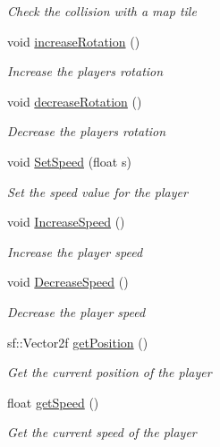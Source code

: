 \begin{DoxyCompactItemize}
\begin{DoxyCompactList}\small\item\em Check the collision with a map tile \end{DoxyCompactList}\item 
void \mbox{\hyperlink{class_player_a0f6f4bb800443551229331a68c3c3234}{increase\+Rotation}} ()
\begin{DoxyCompactList}\small\item\em Increase the players rotation \end{DoxyCompactList}\item 
void \mbox{\hyperlink{class_player_ad65092429c9fcb4d15f6af2591726b81}{decrease\+Rotation}} ()
\begin{DoxyCompactList}\small\item\em Decrease the players rotation \end{DoxyCompactList}\item 
void \mbox{\hyperlink{class_player_ab7bcb2b3c60dd8a86577ee3c488bc50a}{Set\+Speed}} (float s)
\begin{DoxyCompactList}\small\item\em Set the speed value for the player \end{DoxyCompactList}\item 
void \mbox{\hyperlink{class_player_a58c5d05acd71193708fb9e3f29c4f08c}{Increase\+Speed}} ()
\begin{DoxyCompactList}\small\item\em Increase the player speed \end{DoxyCompactList}\item 
void \mbox{\hyperlink{class_player_a0fc0bbed0ac5c2a0e25136b3e83faae6}{Decrease\+Speed}} ()
\begin{DoxyCompactList}\small\item\em Decrease the player speed \end{DoxyCompactList}\item 
sf\+::\+Vector2f \mbox{\hyperlink{class_player_a23356f99a9de86d3d47eadb679b332dc}{get\+Position}} ()
\begin{DoxyCompactList}\small\item\em Get the current position of the player \end{DoxyCompactList}\item 
float \mbox{\hyperlink{class_player_a63caffe9c0cbb3b776811ad45a545aa9}{get\+Speed}} ()
\begin{DoxyCompactList}\small\item\em Get the current speed of the player \end{DoxyCompactList}\item 

\end{DoxyCompactItemize}
